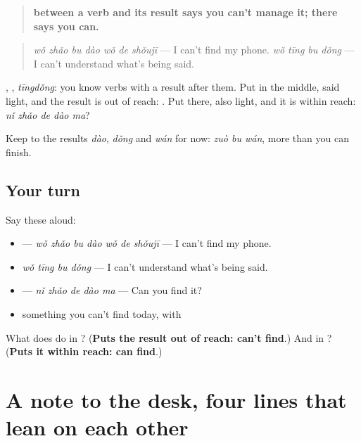\begin{grammarlens}[title={Grammar Lens: \zh{找不到} and \zh{找得到}, can't and can}]
\begin{quote}
\textbf{ between a verb and its result says you can't manage it;  there says you can.}
\end{quote}

\begin{quote}
\textbf{} \emph{wǒ zhǎo bu dào wǒ de shǒujī} — I can't find my phone. \emph{wǒ tīng bu dǒng} — I can't understand what's being said.
\end{quote}

, , \emph{tīngdǒng}: you know verbs with a result after them. Put  in the middle, said light, and the result is out of reach: . Put  there, also light, and it is within reach: \textbf{} \emph{nǐ zhǎo de dào ma}?

Keep to the results \emph{dào}, \emph{dǒng} and \emph{wán} for now: \emph{zuò bu wán}, more than you can finish.
\end{grammarlens}

\subsection*{Your turn}
Say these aloud:

\begin{itemize}
\raggedright
  \item {} — \emph{wǒ zhǎo bu dào wǒ de shǒujī} — I can't find my phone.
  \item \emph{wǒ tīng bu dǒng} — I can't understand what's being said.
  \item {} — \emph{nǐ zhǎo de dào ma} — Can you find it?
  \item something you can't find today, with 
\end{itemize}

\begin{tcolorbox}[breakable,colback=teal!4,colframe=teal!35!black,title={Before you move on}]
What does  do in ? (\textbf{Puts the result out of reach: can't find}.) And  in ? (\textbf{Puts it within reach: can find}.)
\end{tcolorbox}
\section[(a note)]{A note to the desk, four lines that lean on each other}

